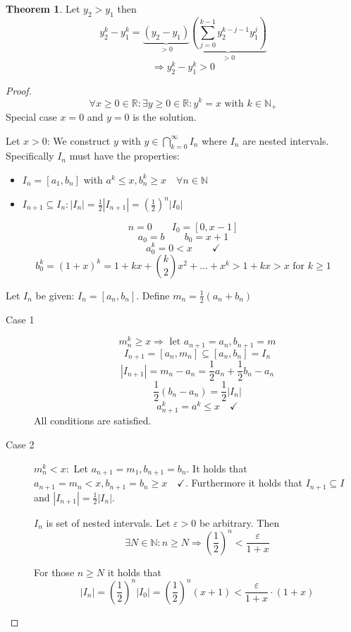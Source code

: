 \documentclass[a4paper,landscape,twocolumn]{article}
\theoremstyle{definition}
\newtheorem{theorem}{Theorem}
\newcommand\abs[1]{\left|#1\right|}
\begin{document}
\begin{theorem}
  Let $y_2 > y_1$ then
  \[ y_2^k - y_1^k = \underbrace{(y_2 - y_1)}_{> 0} \underbrace{\left(\sum_{j=0}^{k-1} y_2^{k-j-1} y_1^j\right)}_{> 0} \]
  \[ \Rightarrow y_2^k - y_1^k > 0 \]
\end{theorem}

\begin{proof}
  \[ \forall x \geq 0 \in \mathbb R: \exists y \geq 0 \in \mathbb R: y^k = x \text{ with } k \in \mathbb N_+ \]
  Special case $x = 0$ and $y = 0$ is the solution.

  Let $x > 0$: We construct $y$ with $y \in \bigcap_{k=0}^\infty I_n$
  where $I_n$ are nested intervals.
  Specifically $I_n$ must have the properties:
  \begin{itemize}
    \item $I_n = [a_1, b_n]$ with $a^k \leq x, b_n^k \geq x \quad \forall n \in \mathbb N$
    \item $I_{n+1} \subseteq I_n: \abs{I_n} = \frac12 \abs{I_{n+1}} = \left(\frac12\right)^n \abs{I_0}$
  \end{itemize}

  \[ n = 0 \qquad I_0 = [0, x-1] \]
  \[ a_0 = b \qquad b_0 = x + 1 \]
  \[ a_0^k = 0 < x \qquad\checkmark \]
  \[ b_0^k = (1 + x)^k = 1 + kx + \binom k2 x^2 + \dots + x^k > 1 + kx > x \text{ for } k \geq 1 \]

  Let $I_n$ be given: $I_n = [a_n, b_n]$.
  Define $m_n = \frac12 (a_n + b_n)$
  \begin{description}
    \item[Case 1]
      \[ m_n^k \geq x \Rightarrow \text{ let } a_{n+1} = a_n, b_{n+1} = m \]
      \[ I_{n+1} = [a_n, m_n] \subseteq [a_n, b_n] = I_n \]
      \[ \abs{I_{n+1}} = m_n - a_n = \frac12 a_n + \frac12 b_n - a_n \]
      \[ \frac12 (b_n - a_n) = \frac12 \abs{I_n} \]
      \[ a_{n+1}^k = a^k \leq x \quad\checkmark \]
      All conditions are satisfied.
    \item[Case 2] $m_n^k < x: $
      Let $a_{n+1} = m_1, b_{n+1} = b_n$.
      It holds that $a_{n+1} = m_n < x, b_{n+1} = b_n \geq x \quad\checkmark$.
      Furthermore it holds that $I_{n+1} \subseteq I$ and $\abs{I_{n+1}} = \frac12 \abs{I_n}$.

      $I_n$ is set of nested intervals.
      Let $\varepsilon > 0$ be arbitrary. Then
      \[ \exists N \in \mathbb N: n \geq N \Rightarrow \left(\frac12\right)^n < \frac{\varepsilon}{1 + x} \]

      For those $n \geq N$ it holds that
      \[
          \abs{I_n} = \left(\frac12\right)^n \abs{I_{0}}
          = \left(\frac12\right)^n (x + 1)
          < \frac{\varepsilon}{1 + x} \cdot (1 + x)
      \]


\end{description}
\end{proof}
\end{document}
